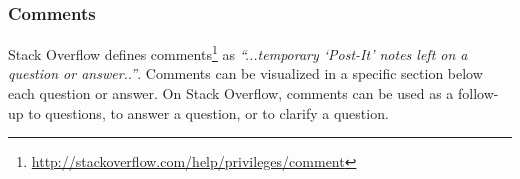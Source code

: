 \documentclass{sig-alternate-05-2015}
\begin{document}







\subsubsection{Comments}
	Stack Overflow defines comments\footnote{\url{http://stackoverflow.com/help/privileges/comment}} as \textit{``...temporary `Post-It' notes left on a question or answer..''}.
	Comments can be visualized in a specific section below each question or answer.
	On Stack Overflow, comments can be used as a follow-up to questions, to answer a question, or to clarify a question.
\end{document}
